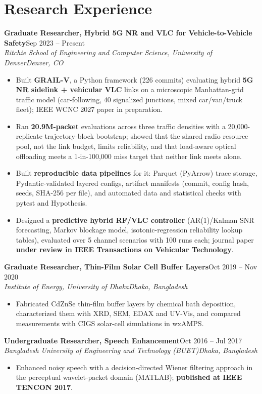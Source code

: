 \documentclass[10pt,letterpaper]{article}
\newcommand{\entry}[4]{\textbf{#1}\hfill #2\\\textit{#3}\hfill\textit{#4}\par}
\begin{document}
\section*{Research Experience}
\entry{Graduate Researcher, Hybrid 5G NR and VLC for Vehicle-to-Vehicle Safety}{Sep 2023 – Present}{Ritchie School of Engineering and Computer Science, University of Denver}{Denver, CO}
\begin{itemize}\item Built \textbf{GRAIL-V}, a Python framework (226 commits) evaluating hybrid \textbf{5G NR sidelink + vehicular VLC} links on a microscopic Manhattan-grid traffic model (car-following, 40 signalized junctions, mixed car/van/truck fleet); IEEE WCNC 2027 paper in preparation.\item Ran \textbf{20.9M-packet} evaluations across three traffic densities with a 20,000-replicate trajectory-block bootstrap; showed that the shared radio resource pool, not the link budget, limits reliability, and that load-aware optical offloading meets a 1-in-100,000 miss target that neither link meets alone.\item Built \textbf{reproducible data pipelines} for it: Parquet (PyArrow) trace storage, Pydantic-validated layered configs, artifact manifests (commit, config hash, seeds, SHA-256 per file), and automated data and statistical checks with pytest and Hypothesis.\item Designed a \textbf{predictive hybrid RF/VLC controller} (AR(1)/Kalman SNR forecasting, Markov blockage model, isotonic-regression reliability lookup tables), evaluated over 5 channel scenarios with 100 runs each; journal paper \textbf{under review in IEEE Transactions on Vehicular Technology}.\end{itemize}
\vspace{2pt}
\entry{Graduate Researcher, Thin-Film Solar Cell Buffer Layers}{Oct 2019 – Nov 2020}{Institute of Energy, University of Dhaka}{Dhaka, Bangladesh}
\begin{itemize}\item Fabricated CdZnSe thin-film buffer layers by chemical bath deposition, characterized them with XRD, SEM, EDAX and UV-Vis, and compared measurements with CIGS solar-cell simulations in wxAMPS.\end{itemize}
\vspace{2pt}
\entry{Undergraduate Researcher, Speech Enhancement}{Oct 2016 – Jul 2017}{Bangladesh University of Engineering and Technology (BUET)}{Dhaka, Bangladesh}
\begin{itemize}\item Enhanced noisy speech with a decision-directed Wiener filtering approach in the perceptual wavelet-packet domain (MATLAB); \textbf{published at IEEE TENCON 2017}.\end{itemize}
\vspace{2pt}
\end{document}
